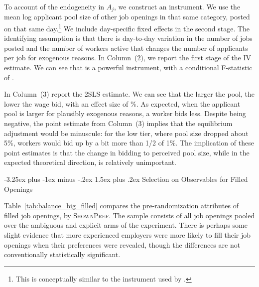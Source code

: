 \documentclass[12pt]{article}
\makeatletter
\renewcommand{\subsection}{%
  \@startsection{subsection}{2}{\z@}%
  {-3.25ex plus -1ex minus -.2ex}%
  {1.5ex plus .2ex}%
  {\normalfont\large\bfseries}%
}
\makeatother
\begin{document}


To account of the endogeneity in $A_j$, we construct an instrument. 
We use the mean log applicant pool size of other job openings in that same category, posted on that same day.\footnote{
  This is conceptually similar to the instrument used by \cite{camerer1997labor}. 
}
We include day-specific fixed effects in the second stage.
The identifying assumption is that there is day-to-day variation in the number of jobs posted and the number of workers active that changes the number of applicants per job for exogenous reasons.
In Column~(2), we report the first stage of the IV estimate.
We can see that is a powerful instrument, with a conditional F-statistic of \IVcondFstat{}. 

In Column~(3) report the 2SLS estimate.
We can see that the larger the pool, the lower the wage bid, with an effect size of \PoolSizeIV{}\%. 
As expected, when the applicant pool is larger for plausibly exogenous reasons, a worker bids less.
Despite being negative, the point estimate from Column~(3) implies that the equilibrium adjustment would be minuscule: 
 for the low tier, where pool size dropped about 5\%, workers would bid up by a bit more than 1/2 of 1\%. 
The implication of these point estimates is that the change in bidding to perceived pool size, while in the expected theoretical direction, is relatively unimportant.




\subsection{Selection on Observables for Filled Openings} 
\label{supp_app:soo}

Table~\ref{tab:balance_big_filled} compares the pre-randomization attributes of filled job openings, by \textsc{ShownPref}.
The sample consists of all job openings pooled over the ambiguous and explicit arms of the experiment.
There is perhaps some slight evidence that more experienced employers were more likely to fill their job openings when their preferences were revealed, though the differences are not conventionally statistically significant.
\end{document}
